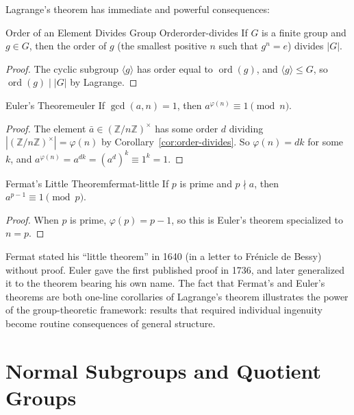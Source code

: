 \documentclass[11pt, a4paper, oneside]{book}
\newcommand{\Z}{\mathbb{Z}}
\newcommand{\ord}{\operatorname{ord}}
\begin{document}
Lagrange's theorem has immediate and powerful consequences:

\begin{cor}{Order of an Element Divides Group Order}{order-divides}
If $G$ is a finite group and $g \in G$, then the order of $g$ (the smallest
positive $n$ such that $g^n = e$) divides $|G|$.
\end{cor}

\begin{proof}
The cyclic subgroup $\langle g \rangle$ has order equal to $\ord(g)$, and
$\langle g \rangle \leq G$, so $\ord(g) \mid |G|$ by Lagrange.
\end{proof}

\begin{cor}{Euler's Theorem}{euler}
If $\gcd(a, n) = 1$, then $a^{\varphi(n)} \equiv 1 \pmod{n}$.
\end{cor}

\begin{proof}
The element $\bar{a} \in (\Z/n\Z)^\times$ has some order $d$ dividing
$|(\Z/n\Z)^\times| = \varphi(n)$ by Corollary~\ref{cor:order-divides}.
So $\varphi(n) = dk$ for some $k$, and
$a^{\varphi(n)} = a^{dk} = (a^d)^k \equiv 1^k = 1$.
\end{proof}

\begin{cor}{Fermat's Little Theorem}{fermat-little}
If $p$ is prime and $p \nmid a$, then $a^{p-1} \equiv 1 \pmod{p}$.
\end{cor}

\begin{proof}
When $p$ is prime, $\varphi(p) = p - 1$, so this is Euler's theorem
specialized to $n = p$.
\end{proof}

\begin{historical}[title={Euler Proves Fermat}]
Fermat stated his ``little theorem'' in 1640 (in a letter to Frénicle de
Bessy) without proof. Euler gave the first published proof in 1736, and
later generalized it to the theorem bearing his own name. The fact that
Fermat's and Euler's theorems are both one-line corollaries of Lagrange's
theorem illustrates the power of the group-theoretic framework: results that
required individual ingenuity become routine consequences of general structure.
\end{historical}

\section{Normal Subgroups and Quotient Groups}
\end{document}
